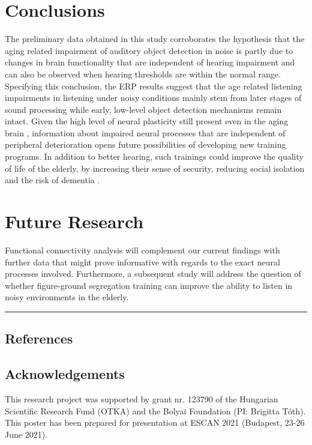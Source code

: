 \documentclass[a0,landscape]{a0poster}
\begin{document}
\begin{multicols}{3}

\section*{Conclusions}

The preliminary data obtained in this study corroborates the hypothesis that the aging related impairment of auditory object detection in noise is partly due to changes in brain functionality that are independent of hearing impairment and can also be observed when hearing thresholds are within the normal range. Specifying this conclusion, the ERP results suggest that the age related listening impairments in listening under noisy conditions mainly stem from later stages of sound processing while early, low-level object detection mechanisms remain intact. Given the high level of neural plasticity still present even in the aging brain \autocite{Grady2012}, information about impaired neural processes that are independent of peripheral deterioration opens future possibilities of developing new training programs. In addition to better hearing, such trainings could improve the quality of life of the elderly, by increasing their sense of security, reducing social isolation and the risk of dementia \autocite{Slade2020}.

\section*{Future Research}

Functional connectivity analysis will complement our current findings with further data that might prove informative with regards to the exact neural processes involved. Furthermore, a subsequent study will address the question of whether figure-ground segregation training can improve the ability to listen in noisy environments in the elderly.

\end{multicols}

\noindent\rule{\textwidth}{3pt}

\columnseprule=0pt

\begin{multicols}{3}
	\subsection*{References}
	\vspace{-5pt}
	\AtNextBibliography{\tiny}
	\printbibliography[heading=none]
	
	\subsection*{Acknowledgements}
	\tiny
	This research project was supported by grant nr. 123790 of the Hungarian Scientific Research Fund (OTKA) and the Bolyai Foundation (PI: Brigitta Tóth). This poster has been prepared for presentation at ESCAN 2021 (Budapest, 23-26 June 2021).
\end{multicols}
\end{document}
